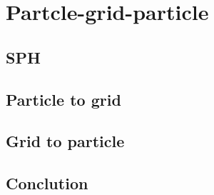 \chapter{Partcle-grid-particle}


\section{SPH}

\section{Particle to grid}

\section{Grid to particle}

\section{Conclution}